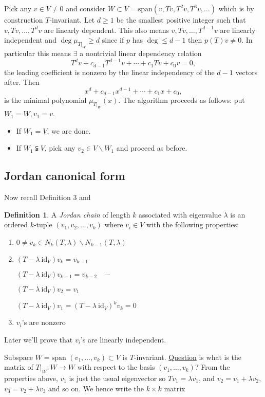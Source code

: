 \documentclass[a4paper]{article}
\theoremstyle{definition}
\newtheorem{defn}{Definition}[subsection]
\begin{document}
Pick any $v\in V\neq 0 $ and consider $W\subset V = \text{span} \left(v,Tv,T^2v,T^3v,\ldots \right)$ which is by construction $T$-invariant. Let $d\geq 1$ be the smallest positive integer such that $v,Tv,\ldots,T^dv$ are linearly dependent. This also means $v,Tv,\ldots,T^{d-1}v$ are linearly independent and $\deg \mu_{\left.T\right|_W} \geq d$ since if $p$ has $\deg \leq d-1$ then $p(T)v \neq 0$. In particular this means $\exists$ a nontrivial linear dependency relation
\[
T^dv+c_{d-1}T^{d-1}v+\cdots+c_1Tv+c_0v=0 ,
\]
the leading coefficient is nonzero by the linear independency of the $d-1$ vectors after. Then
\[
x^d+c_{d-1}x^{d-1}+\cdots+c_1 x+c_0 ,
\]
is the minimal polynomial $\mu_{\left. T\right|_W}(x)$. The algorithm proceeds as follows: put $W_1=W,v_1=v$. \begin{itemize}
	\item If $W_1=V$, we are done.
	\item If $W_1 \subsetneqq V$, pick any $v_2\in V\backslash W_1$ and proceed as before.
\end{itemize}

\subsection{Jordan canonical form}
Now recall Definition 3 and 
\begin{defn}
	A \textit{Jordan chain} of length $k$ associated with eigenvalue $\lambda$ is an ordered $k$-tuple $(v_1,v_2,\ldots,v_k)$ where $v_i \in V$ with the following properties:
	\begin{enumerate}
		\item $0\neq v_k \in N_k(T,\lambda)\backslash N_{k-1}(T,\lambda)$
		\item $(T-\lambda \ \text{id}_V)v_k=v_{k-1}$

		$(T-\lambda \ \text{id}_V)v_{k-1}=v_{k-2} \quad \cdots$

		$(T-\lambda \ \text{id}_V)v_2=v_1$

		$(T-\lambda \ \text{id}_V)v_1= (T-\lambda \ \text{id}_V)^k v_k=0$
		\item $v_i$'s are nonzero
	\end{enumerate}
\end{defn}
Later we'll prove that $v_i$'s are linearly independent.

Subspace $W=\text{span }(v_1,\ldots,v_k)\subset V$ is $T$-invariant. \underline{Question} is what is the matrix of $\left. T\right|_W:W\rightarrow W$ with respect to the basis $(v_1,\ldots,v_k)$? From the properties above, $v_1$ is just the usual eigenvector so $Tv_1=\lambda v_1$, and $v_2=v_1+\lambda v_2$, $v_3=v_2+\lambda v_3$ and so on. We hence write the $k\times k$ matrix
\end{document}
